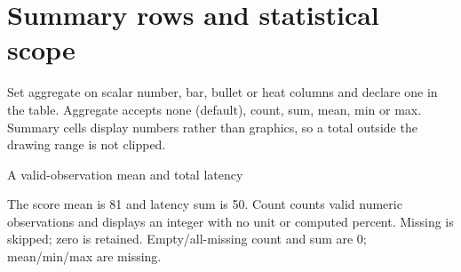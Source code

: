 \section{Summary rows and statistical scope}
\label{sec:summary}
Set aggregate on scalar number, bar, bullet or heat columns and declare one
 in the table. Aggregate accepts none (default), count, sum, mean,
min or max. Summary cells display numbers rather than graphics, so a total
outside the drawing range is not clipped.
\begin{demo}{A valid-observation mean and total latency}
\begin{center}
\begin{gradtable}[align=c,header align=c,style=academic,theme=teal,width=\linewidth]
\end{gradtable}
\end{center}
\end{demo}
The score mean is 81 and latency sum is 50. Count counts valid numeric observations
and displays an integer with no unit or computed percent. Missing is skipped;
zero is retained. Empty/all-missing count and sum are 0; mean/min/max are missing.
